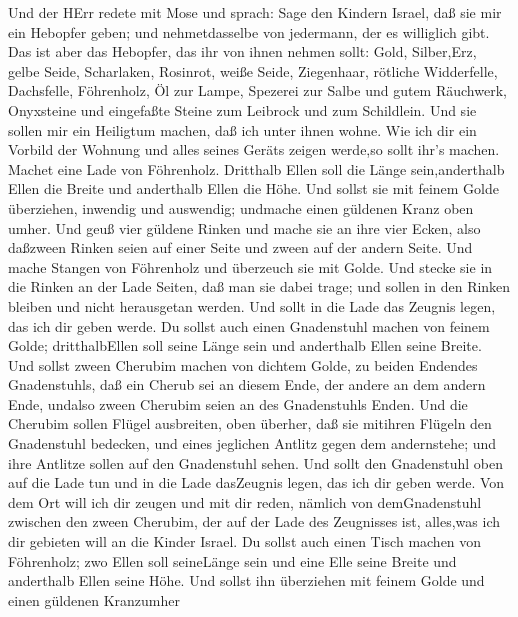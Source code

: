  Und der HErr redete mit Mose und sprach:  Sage
den Kindern Israel, daß sie mir ein Hebopfer geben; und nehmetdasselbe
von jedermann, der es williglich gibt.  Das ist aber das
Hebopfer, das ihr von ihnen nehmen sollt: Gold, Silber,Erz, 
gelbe Seide, Scharlaken, Rosinrot, weiße Seide, Ziegenhaar, 
rötliche Widderfelle, Dachsfelle, Föhrenholz,  Öl zur Lampe,
Spezerei zur Salbe und gutem Räuchwerk,  Onyxsteine und
eingefaßte Steine zum Leibrock und zum Schildlein.  Und sie
sollen mir ein Heiligtum machen, daß ich unter ihnen wohne. 
Wie ich dir ein Vorbild der Wohnung und alles seines Geräts zeigen
werde,so sollt ihr's machen.  Machet eine Lade von
Föhrenholz. Dritthalb Ellen soll die Länge sein,anderthalb Ellen die
Breite und anderthalb Ellen die Höhe.  Und sollst sie mit
feinem Golde überziehen, inwendig und auswendig; undmache einen güldenen
Kranz oben umher.  Und geuß vier güldene Rinken und mache
sie an ihre vier Ecken, also daßzween Rinken seien auf einer Seite und
zween auf der andern Seite.  Und mache Stangen von
Föhrenholz und überzeuch sie mit Golde.  Und stecke sie in
die Rinken an der Lade Seiten, daß man sie dabei trage; 
und sollen in den Rinken bleiben und nicht herausgetan werden.
 Und sollt in die Lade das Zeugnis legen, das ich dir geben
werde.  Du sollst auch einen Gnadenstuhl machen von feinem
Golde; dritthalbEllen soll seine Länge sein und anderthalb Ellen seine
Breite.  Und sollst zween Cherubim machen von dichtem
Golde, zu beiden Endendes Gnadenstuhls,  daß ein Cherub sei
an diesem Ende, der andere an dem andern Ende, undalso zween Cherubim
seien an des Gnadenstuhls Enden.  Und die Cherubim sollen
Flügel ausbreiten, oben überher, daß sie mitihren Flügeln den
Gnadenstuhl bedecken, und eines jeglichen Antlitz gegen dem andernstehe;
und ihre Antlitze sollen auf den Gnadenstuhl sehen.  Und
sollt den Gnadenstuhl oben auf die Lade tun und in die Lade dasZeugnis
legen, das ich dir geben werde.  Von dem Ort will ich dir
zeugen und mit dir reden, nämlich von demGnadenstuhl zwischen den zween
Cherubim, der auf der Lade des Zeugnisses ist, alles,was ich dir
gebieten will an die Kinder Israel.  Du sollst auch einen
Tisch machen von Föhrenholz; zwo Ellen soll seineLänge sein und eine
Elle seine Breite und anderthalb Ellen seine Höhe.  Und
sollst ihn überziehen mit feinem Golde und einen güldenen Kranzumher
